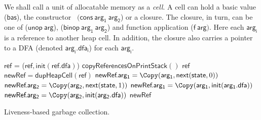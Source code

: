 \documentclass[9pt,nonatbib]{sigplanconf}
\begin{document}
We shall call a  unit of allocatable memory as a {\em  cell}.  A cell can
hold    a    basic    value    ($\mathsf{bas}$),    the    constructor
\CONS\ $(\mathsf{cons~  arg_1~arg_2}$) or a closure.   The closure, in
turn,    can    be    one   of    ($\mathsf{unop~arg}$),    ($\mathsf{
  binop~arg_1~arg_2}$)  and  function application  ($\mathsf{f~arg})$.
Here each $\mathsf{  arg_i}$ is a reference to another  heap cell.  In
addition, the closure also carries  a pointer to a DFA (denoted
$\mathsf{arg_i.dfa_i}$) for each $\mathsf{arg_i}$.
  \SetStartEndCondition{ }{}{}%
  \AlgoDontDisplayBlockMarkers\SetAlgoNoEnd\SetAlgoNoLine%

\begin{algorithm}[ht!]
  \Pro{\Lgc{}}
     {
            {$\mathsf{ref}$ = \Copy($\mathsf{ref}, \mathsf{init}(\mathsf{ref.dfa})$)\;}
            ${\mathsf{copyReferencesOnPrintStack}()}$\;  
     }
        {
           {\KwRet $\mathsf{ref}$\;}
          $\mathsf{newRef} = \mathsf{dupHeapCell}(\mathsf{ref})$\;
             {
               {
                 $\mathsf{newRef}\!.\mathsf{arg_1}  = \Copy(\mathsf{arg_1}, \mathsf{next}(\mathsf{state}, 0))$\;
               }
               {
                 $\mathsf{newRef}\!.\mathsf{arg_2} =  \Copy(\mathsf{arg_2},
                 \mathsf{next}(\mathsf{state} , 1))$\;
               }    
             }
             { 
               $\mathsf{newRef}\!.\mathsf{arg_1} = \Copy(\mathsf{arg_1}, \mathsf{init}(\mathsf{arg_1.dfa}))$\;
               $\mathsf{newRef}\!.\mathsf{arg_2} = \Copy(\mathsf{arg_2}, \mathsf{init}(\mathsf{arg_2.dfa}))$\;
             }
             \KwRet $\mathsf{newRef}$\;
        }
        \caption{Liveness-based garbage collection.  \label{algo:lgc-a}}
\end{algorithm}
\end{document}
